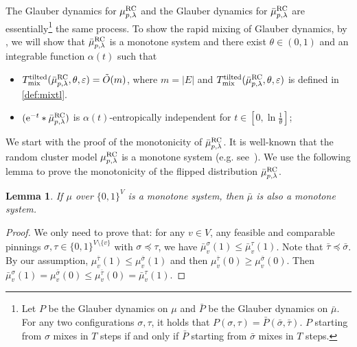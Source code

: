 \documentclass[11pt,a4paper]{article}
\newcommand{\e}{\mathrm{e}}
\renewcommand{\epsilon}{\varepsilon}
\newcommand{\mixtl}{T_{\textnormal{mix}}^{\textnormal{tilted}}}
\newtheorem{lemma}[theorem]{Lemma}
\theoremstyle{definition}
\begin{document}
The Glauber dynamics for $\mu_{p,\lambda}^{\textnormal{RC}}$ and the Glauber dynamics for $\bar{\mu}_{p,\lambda}^{\textnormal{RC}}$ are essentially\footnote{Let $P$ be the Glauber dynamics on $\mu$ and $\bar{P}$ be the Glauber dynamics on $\bar{\mu}$. For any two configurations $\sigma,\tau$, it holds that $P(\sigma,\tau)=\bar{P}(\bar{\sigma},\bar{\tau})$. $P$ starting from $\sigma$ mixes in $T$ steps if and only if $\bar{P}$ starting from $\bar{\sigma}$ mixes in $T$ steps.} the same process.
To show the rapid mixing of Glauber dynamics, by , we will show that $\bar{\mu}_{p,\lambda}^{\textnormal{RC}}$ is a monotone system and there exist $\theta\in (0,1)$ and an integrable function $\alpha(t)$ such that
\begin{itemize}
    \item $\mixtl(\bar{\mu}_{p,\lambda}^{\textnormal{RC}},\theta,\epsilon) = \tilde{O}(m)$, where $m = |E|$ and $\mixtl(\bar{\mu}_{p,\lambda}^{\textnormal{RC}},\theta,\epsilon)$ is defined in \eqref{def:mixtl}.
    \item $(\e^{-t} *\bar{\mu}_{p,\lambda}^{\textnormal{RC}})$ is $\alpha(t)$-entropically independent for $t\in [0,\ln \frac{1}{\theta}]$;
\end{itemize}

We start with the proof of the monotonicity of $\bar{\mu}_{p,\lambda}^{\textnormal{RC}}$. It is well-known that the random cluster model $\mu_{p,\lambda}^{\textnormal{RC}}$ is a monotone system (e.g. see~\cite[Lem. 8.2]{feng2023swendsen}). We use the following lemma to prove the monotonicity of the flipped distribution $\bar{\mu}_{p,\lambda}^{\textnormal{RC}}$.
\begin{lemma}\label{lem:monotone-flipped}
    If $\mu$ over $\{0,1\}^V$ is a monotone system, then $\bar{\mu}$ is also a monotone system.    
    \end{lemma}
    \begin{proof}
    We only need to prove that: for any $v\in V$, any feasible and comparable pinnings $\sigma,\tau \in \{0,1\}^{V\setminus \{v\}}$ with $\sigma\preceq \tau$, we have $\bar{\mu}_v^{\sigma}(1)\leq \bar{\mu}_v^{\tau}(1)$.
    Note that $\bar{\tau}\preceq \bar{\sigma}$. By our assumption, $\mu_v^{\bar{\tau}}(1)\leq \mu_v^{\bar{\sigma}}(1)$ and then $\mu_v^{\bar{\tau}}(0)\geq \mu_v^{\bar{\sigma}}(0)$. Then $\bar{\mu}_v^{\sigma}(1) = \mu_v^{\bar{\sigma}}(0)\leq \mu_v^{\bar{\tau}}(0) = \bar{\mu}_v^{\tau}(1)$.
    \end{proof}
\end{document}
